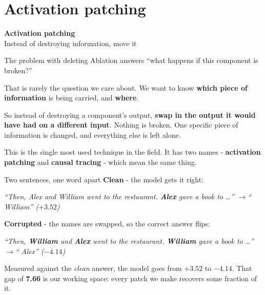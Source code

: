 \documentclass[aspectratio=169]{beamer}
\newcommand{\keybox}[1]{%
  \begin{tcolorbox}[colback=armblue!8, colframe=armblue, boxrule=0.6pt, arc=2pt]
  #1
  \end{tcolorbox}}
\newcommand{\promptbox}[1]{%
  \begin{center}
  \begin{tcolorbox}[colback=lightbg, colframe=gray, boxrule=0.5pt, arc=2pt, width=0.88\textwidth]
    \centering\textit{#1}
  \end{tcolorbox}
  \end{center}}
\newcommand{\sectiontransition}[2]{%
  \begin{frame}[plain]
    \vfill
    \begin{center}
      {\Huge\bfseries\color{popblue} #1}\\[1.1em]
      {\large #2}
    \end{center}
    \vfill
  \end{frame}}
\begin{document}
\section{Activation patching}
\sectiontransition{Activation patching}{Instead of destroying information, move it}

\begin{frame}{The problem with deleting}
  \vspace{0.8em}
  Ablation answers ``what happens if this component is broken?''

  \vspace{0.6em}
  That is rarely the question we care about. We want to know \textbf{which piece of information}
  is being carried, and \textbf{where}.

  \vspace{1.0em}
  \keybox{So instead of destroying a component's output, \textbf{swap in the output it would have
  had on a different input}. Nothing is broken. One specific piece of information is changed, and
  everything else is left alone.}

  \vspace{0.9em}
  This is the single most used technique in the field. It has two names - \textbf{activation
  patching} and \textbf{causal tracing} - which mean the same thing.
\end{frame}

\begin{frame}{Two sentences, one word apart}
  \vspace{0.5em}
  \textbf{Clean} - the model gets it right:
  \promptbox{``Then, Alex and William went to the restaurant. \textcolor{armblue}{\textbf{Alex}}
  gave a book to \ldots'' \quad$\rightarrow$\quad `` William'' \quad ($+3.52$)}

  \vspace{0.2em}
  \textbf{Corrupted} - the names are swapped, so the correct answer flips:
  \promptbox{``Then, \textcolor{armred}{\textbf{William}} and
  \textcolor{armred}{\textbf{Alex}} went to the restaurant. \textcolor{armred}{\textbf{William}}
  gave a book to \ldots'' \quad$\rightarrow$\quad `` Alex'' \quad ($-4.14$)}

  \vspace{0.5em}
  \keybox{Measured against the \emph{clean} answer, the model goes from $+3.52$ to $-4.14$. That
  gap of \textbf{7.66} is our working space: every patch we make recovers some fraction of it.}
\end{frame}
\end{document}
